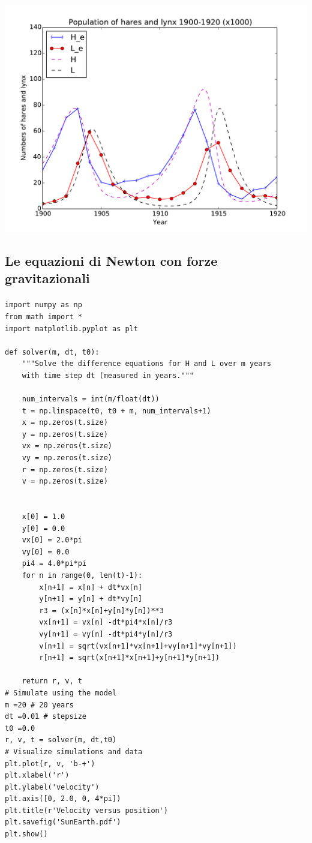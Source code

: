 \documentclass[%
oneside,                 %
final,                   %
10pt]{article}
\begin{document}
\centerline{\includegraphics[width=0.9\linewidth]{fig/Hudson_Bay_sim.pdf}}

\vspace{6mm}




\subsection*{Le equazioni di Newton con forze gravitazionali}

\paragraph{}
\begin{verbatim}
import numpy as np
from math import *
import matplotlib.pyplot as plt

def solver(m, dt, t0):
    """Solve the difference equations for H and L over m years
    with time step dt (measured in years."""

    num_intervals = int(m/float(dt))
    t = np.linspace(t0, t0 + m, num_intervals+1)
    x = np.zeros(t.size)
    y = np.zeros(t.size)
    vx = np.zeros(t.size)
    vy = np.zeros(t.size)
    r = np.zeros(t.size)
    v = np.zeros(t.size)


    x[0] = 1.0
    y[0] = 0.0
    vx[0] = 2.0*pi
    vy[0] = 0.0
    pi4 = 4.0*pi*pi
    for n in range(0, len(t)-1):
        x[n+1] = x[n] + dt*vx[n]
        y[n+1] = y[n] + dt*vy[n]
        r3 = (x[n]*x[n]+y[n]*y[n])**3
        vx[n+1] = vx[n] -dt*pi4*x[n]/r3
        vy[n+1] = vy[n] -dt*pi4*y[n]/r3
        v[n+1] = sqrt(vx[n+1]*vx[n+1]+vy[n+1]*vy[n+1])
        r[n+1] = sqrt(x[n+1]*x[n+1]+y[n+1]*y[n+1])

    return r, v, t
# Simulate using the model
m =20 # 20 years
dt =0.01 # stepsize
t0 =0.0
r, v, t = solver(m, dt,t0)
# Visualize simulations and data
plt.plot(r, v, 'b-+')
plt.xlabel('r')
plt.ylabel('velocity')
plt.axis([0, 2.0, 0, 4*pi])
plt.title(r'Velocity versus position')
plt.savefig('SunEarth.pdf')
plt.show()

\end{verbatim}








\end{document}
